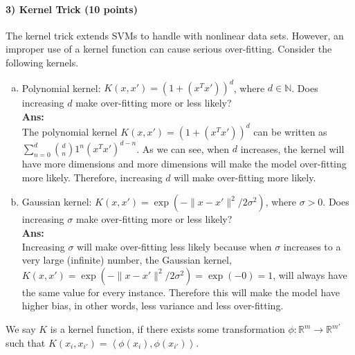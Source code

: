 \documentclass[11pt]{article}
\begin{document}
\paragraph{3) Kernel Trick (10 points)}
The kernel trick extends SVMs to handle with nonlinear data sets. However, an improper use of a kernel function can cause serious over-fitting. Consider the following kernels.
\begin{enumerate}[(a)]
\item Polynomial kernel: $K(x, x') = (1 + (x^Tx'))^d$, where  $d\in\mathbb{N}$. Does increasing $d$ make over-fitting more or less likely?\\
\textbf{Ans:}\\
The polynomial kernel $K(x, x') = (1 + (x^Tx'))^d$ can be written as $\sum_{n=0}^{d}{d \choose n}1^n(x^Tx')^{d-n}$. As we can see, when $d$ increases, the kernel will have more dimensions and more dimensions will make the model over-fitting more likely. Therefore, increasing $d$ will make over-fitting more likely.\\

\item Gaussian kernel: $K(x, x') = \exp(-\|x-x'\|^2 / 2 \sigma^2)$, where $\sigma>0$. Does increasing $\sigma$ make over-fitting more or less likely?\\
\textbf{Ans:}\\
Increasing $\sigma$ will make over-fitting less likely because when $\sigma$ increases to a very large (infinite) number, the Gaussian kernel, $K(x, x') = \exp(-\|x-x'\|^2 / 2 \sigma^2) = \exp(-0) = 1$, will always have the same value for every instance. Therefore this will make the model have higher bias, in other words, less variance and less over-fitting.\\


\end{enumerate}
We say $K$ is a kernel function, if there exists some transformation $\phi:\mathbb{R}^m\rightarrow \mathbb{R}^{m'}$ such that $K(x_i,x_{i'}) = \left<\phi(x_i),\phi(x_{i'})\right>$.
\end{document}
